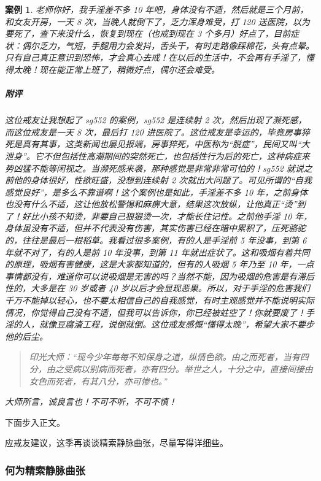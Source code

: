 \documentclass{ctexart}
\newtheorem{case}{案例}
\begin{document}
\begin{case}
    老师你好，我手淫差不多 10 年吧，身体没有不适，然后就是三个月前，和女友开房，一天 8 次，当晚人就倒下了，乏力浑身难受，打 120 送医院，以为要死了，查下来没什么，恢复到现在（也戒到现在 3 个多月）好点了，目前症状：偶尔乏力，气短，手腿用力会发抖，舌头干，有时走路像踩棉花，头有点晕。只有自己真正意识到恐怖，才会真心去戒！在以后的生活中，不会再有手淫了，懂得太晚！现在能正常上班了，稍微好点，偶尔还会难受。
    \subparagraph{附评} 这位戒友让我想起了 sg552 的案例，sg552 是连续射 2 次，然后出现了濒死感，而这位戒友是一天 8 次，最后打 120 进医院了。这位戒友是幸运的，毕竟房事猝死是真有其事，这类新闻也屡见报端，房事猝死，中医称为“脱症”，民间又叫“大泄身”。它不但包括性高潮期间的突然死亡，也包括性行为后的死亡，这种病症来势凶猛不能等闲视之。当濒死感来袭，那种感觉是非常非常可怕的！sg552 就说之前他的身体很好，性欲旺盛，没想到连续射 2 次就出大问题了。可见所谓的“自我感觉良好”，是多么不靠谱啊！这个案例也是如此，手淫差不多 10 年，之前身体也没有什么不适，这让他放松警惕和麻痹大意，结果这次放纵，让他真正“烫”到了！好比小孩不知烫，非要自己狠狠烫一次，才能长住记性。之前他手淫 10 年，身体虽没有不适，但并不代表没有伤害，其实伤害已经在暗中累积了，压死骆驼的，往往是最后一根稻草。我看过很多案例，有的人是手淫前 5 年没事，到第 6 年就不对了，有的人是前 10 年没事，到第 11 年就出症状了。这和吸烟有着共同的原理，吸烟有害健康，这是大家都知道的，但有的人吸烟 5 年乃至 10 年，一点事情都没有，难道你可以说吸烟是无害的吗？当然不能，因为吸烟的危害是有滞后性的，大多是在 30 岁或者 40 岁以后才会显现恶果。所以，对于手淫的危害我们千万不能掉以轻心，也不要太相信自己的自我感觉，有时主观感觉并不能说明实际情况，你觉得自己没有不适，但我可以告诉你，你已经被蛀空了！你就要废了！手淫的人，就像豆腐渣工程，说倒就倒。这位戒友感慨“懂得太晚”，希望大家不要步他的后尘。

    \begin{quote}
        印光大师：“现今少年每每不知保身之道，纵情色欲。由之而死者，当有四分，由之受病以别病而死者，亦有四分。举世之人，十分之中，直接间接由女色而死者，有其八分，亦可惨也。”
    \end{quote}

    大师所言，诚良言也！不可不听，不可不慎！
\end{case}

下面步入正文。

应戒友建议，这季再谈谈精索静脉曲张，尽量写得详细些。

\subsubsection{何为精索静脉曲张}
\end{document}
